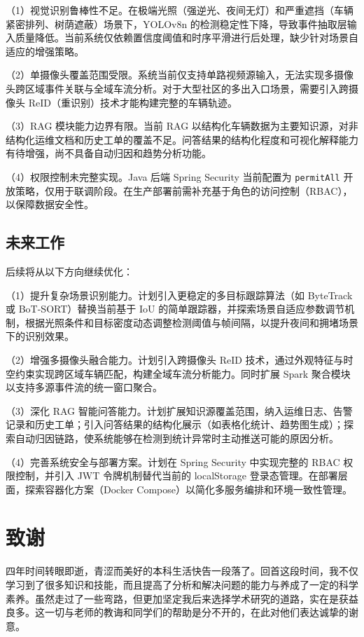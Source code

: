 \documentclass{wzuthesis} %
\begin{document}
（1）视觉识别鲁棒性不足。在极端光照（强逆光、夜间无灯）和严重遮挡（车辆紧密排列、树荫遮蔽）场景下，YOLOv8n 的检测稳定性下降，导致事件抽取层输入质量降低。当前系统仅依赖置信度阈值和时序平滑进行后处理，缺少针对场景自适应的增强策略。

（2）单摄像头覆盖范围受限。系统当前仅支持单路视频源输入，无法实现多摄像头跨区域事件关联与全域车流分析。对于大型社区的多出入口场景，需要引入跨摄像头 ReID（重识别）技术才能构建完整的车辆轨迹。

（3）RAG 模块能力边界有限。当前 RAG 以结构化车辆数据为主要知识源，对非结构化运维文档和历史工单的覆盖不足。问答结果的结构化程度和可视化解释能力有待增强，尚不具备自动归因和趋势分析功能。

（4）权限控制未完整实现。Java 后端 Spring Security 当前配置为 \texttt{permitAll} 开放策略，仅用于联调阶段。在生产部署前需补充基于角色的访问控制（RBAC），以保障数据安全性。

\section{未来工作}

后续将从以下方向继续优化：

（1）提升复杂场景识别能力。计划引入更稳定的多目标跟踪算法（如 ByteTrack 或 BoT-SORT）替换当前基于 IoU 的简单跟踪器，并探索场景自适应参数调节机制，根据光照条件和目标密度动态调整检测阈值与帧间隔，以提升夜间和拥堵场景下的识别效果。

（2）增强多摄像头融合能力。计划引入跨摄像头 ReID 技术，通过外观特征与时空约束实现跨区域车辆匹配，构建全域车流分析能力。同时扩展 Spark 聚合模块以支持多源事件流的统一窗口聚合。

（3）深化 RAG 智能问答能力。计划扩展知识源覆盖范围，纳入运维日志、告警记录和历史工单；引入问答结果的结构化展示（如表格化统计、趋势图生成）；探索自动归因链路，使系统能够在检测到统计异常时主动推送可能的原因分析。

（4）完善系统安全与部署方案。计划在 Spring Security 中实现完整的 RBAC 权限控制，并引入 JWT 令牌机制替代当前的 localStorage 登录态管理。在部署层面，探索容器化方案（Docker Compose）以简化多服务编排和环境一致性管理。


\backmatter
\renewcommand{\chaptermark}[1]{\markboth{\songti #1}{}}
\chapter{致谢}

四年时间转眼即逝，青涩而美好的本科生活快告一段落了。回首这段时间，我不仅学习到了很多知识和技能，而且提高了分析和解决问题的能力与养成了一定的科学素养。虽然走过了一些弯路，但更加坚定我后来选择学术研究的道路，实在是获益良多。这一切与老师的教诲和同学们的帮助是分不开的，在此对他们表达诚挚的谢意。
\end{document}
